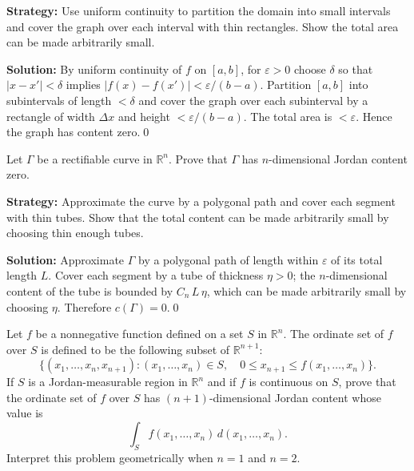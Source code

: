 \noindent\textbf{Strategy:} Use uniform continuity to partition the domain into small intervals and cover the graph over each interval with thin rectangles. Show the total area can be made arbitrarily small.

\bigskip\noindent\textbf{Solution:}
By uniform continuity of $f$ on $[a,b]$, for $\varepsilon>0$ choose $\delta$ so that $|x-x'|<\delta$ implies $|f(x)-f(x')|<\varepsilon/(b-a)$. Partition $[a,b]$ into subintervals of length $<\delta$ and cover the graph over each subinterval by a rectangle of width $\Delta x$ and height $<\varepsilon/(b-a)$. The total area is $<\varepsilon$. Hence the graph has content zero.\qed


\begin{problembox}
\begin{problemstatement}
Let \( \Gamma \) be a rectifiable curve in \( \mathbb{R}^n \). Prove that \( \Gamma \) has \( n \)-dimensional Jordan content zero.
\end{problemstatement}
\end{problembox}

\noindent\textbf{Strategy:} Approximate the curve by a polygonal path and cover each segment with thin tubes. Show that the total content can be made arbitrarily small by choosing thin enough tubes.

\bigskip\noindent\textbf{Solution:}
Approximate $\Gamma$ by a polygonal path of length within $\varepsilon$ of its total length $L$. Cover each segment by a tube of thickness $\eta>0$; the $n$-dimensional content of the tube is bounded by $C_n\,L\,\eta$, which can be made arbitrarily small by choosing $\eta$. Therefore $c(\Gamma)=0$.\qed


\begin{problembox}
\begin{problemstatement}
Let \( f \) be a nonnegative function defined on a set \( S \) in \( \mathbb{R}^n \). The ordinate set of \( f \) over \( S \) is defined to be the following subset of \( \mathbb{R}^{n+1} \):
\[\{(x_1, \ldots, x_n, x_{n+1}) : (x_1, \ldots, x_n) \in S, \quad 0 \leq x_{n+1} \leq f(x_1, \ldots, x_n)\}.\]
If \( S \) is a Jordan-measurable region in \( \mathbb{R}^n \) and if \( f \) is continuous on \( S \), prove that the ordinate set of \( f \) over \( S \) has \( (n + 1) \)-dimensional Jordan content whose value is
\[\int_{S} f(x_1, \ldots, x_n) \, d(x_1, \ldots, x_n).\]
Interpret this problem geometrically when \( n = 1 \) and \( n = 2 \).
\end{problemstatement}
\end{problembox}

